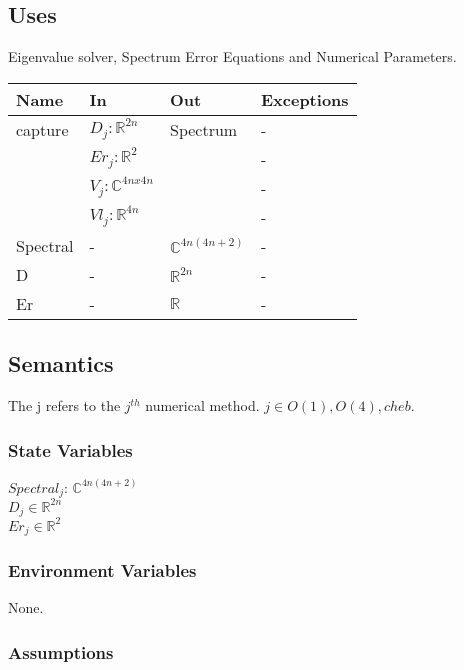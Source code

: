 \documentclass[12pt, titlepage]{article}
\begin{document}
\subsection{Uses}

Eigenvalue solver, Spectrum Error Equations and Numerical Parameters. 

\begin{center}
	\begin{tabular}{p{3cm} p{3cm} p{3cm} >{\raggedright\arraybackslash}p{7cm}}
		\toprule
		\textbf{Name} & \textbf{In} & \textbf{Out} & \textbf{Exceptions} \\
		\hline
		capture & $D_{j} :\mathbb{R}^{2n}$ & Spectrum & - \\ 
		 & $Er_{j} :\mathbb{R}^{2}$ &  & - \\ 
		 & $V_{j} :\mathbb{C}^{4nx4n}$ &  & - \\ 
		 & $Vl_{j} :\mathbb{R}^{4n}$ & & - \\
		Spectral & - & $\mathbb{C}^{4n(4n+2)}$ & - \\
		D & - & $\mathbb{R}^{2n}$ & - \\
		Er & - & $\mathbb{R}$ & - \\
		\hline
	\end{tabular}
\end{center}

\subsection{Semantics}

The j refers to the $j^{th}$ numerical method. $j \in {O(1), O(4), cheb}$.   

\subsubsection{State Variables}

$Spectral_{j}$: $\mathbb{C}^{4n(4n+2)}$ \\
$D_j \in \mathbb{R}^{2n}$ \\
$Er_j \in \mathbb{R}^{2}$ \\  

\subsubsection{Environment Variables}

None.

\subsubsection{Assumptions}
\end{document}
